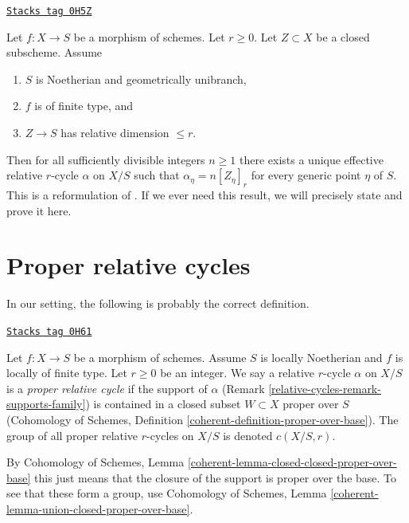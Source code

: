 \begin{remark}
\label{relative-cycles-remark-equidimensional-over-geometrically-unibranch}
\href{https://stacks.math.columbia.edu/tag/0H5Z}{\texttt{Stacks tag 0H5Z}}

Let $f : X \to S$ be a morphism of schemes. Let $r \geq 0$. Let $Z \subset X$
be a closed subscheme. Assume
\begin{enumerate}
\item $S$ is Noetherian and geometrically unibranch,
\item $f$ is of finite type, and
\item $Z \to S$ has relative dimension $\leq r$.
\end{enumerate}
Then for all sufficiently divisible integers $n \geq 1$ there exists a
unique effective relative $r$-cycle $\alpha$ on $X/S$ such that
$\alpha_\eta = n[Z_\eta]_r$ for every generic point $\eta$ of $S$.
This is a reformulation of \cite[Theorem 3.4.2]{SV}.
If we ever need this result, we will precisely state and prove it here.
\end{remark}

\section{Proper relative cycles}
\label{relative-cycles-section-proper}
In our setting, the following is probably the correct definition.

\begin{definition}[Proper]
\label{relative-cycles-definition-proper}
\href{https://stacks.math.columbia.edu/tag/0H61}{\texttt{Stacks tag 0H61}}

Let $f : X \to S$ be a morphism of schemes. Assume $S$ is locally Noetherian
and $f$ is locally of finite type. Let $r \geq 0$ be an integer. We say a
relative $r$-cycle $\alpha$ on $X/S$ is a {\it proper relative cycle}
if the support of $\alpha$ (Remark \ref{relative-cycles-remark-supports-family})
is contained in a closed subset $W \subset X$ proper over $S$
(Cohomology of Schemes, Definition \ref{coherent-definition-proper-over-base}).
The group of all proper relative $r$-cycles on $X/S$ is
denoted $c(X/S, r)$.
\end{definition}

By Cohomology of Schemes, Lemma
\ref{coherent-lemma-closed-closed-proper-over-base}
this just means that the closure of the support is proper over the base.
To see that these form a group, use
Cohomology of Schemes, Lemma \ref{coherent-lemma-union-closed-proper-over-base}.

